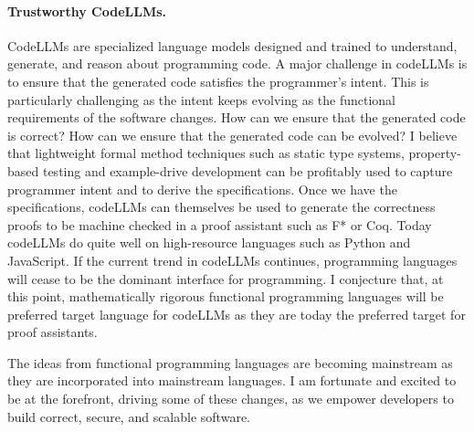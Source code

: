 \documentclass[screen,acmsmall,nonacm]{acmart}
\begin{document}
\paragraph{\bf Trustworthy CodeLLMs.} CodeLLMs are specialized language models
designed and trained to understand, generate, and reason about programming
code. A major challenge in codeLLMs is to ensure that the generated code
satisfies the programmer's intent. This is particularly challenging as the
intent keeps evolving as the functional requirements of the software changes.
How can we ensure that the generated code is correct? How can we ensure that
the generated code can be evolved? I believe that lightweight formal method
techniques such as static type systems, property-based testing and
example-drive development can be profitably used to capture programmer intent
and to derive the specifications. Once we have the specifications, codeLLMs can
themselves be used to generate the correctness proofs to be machine checked in
a proof assistant such as F* or Coq. Today codeLLMs do quite well on
high-resource languages such as Python and JavaScript. If the current trend in
codeLLMs continues, programming languages will cease to be the dominant
interface for programming. I conjecture that, at this point, mathematically
rigorous functional programming languages will be preferred target language for
codeLLMs as they are today the preferred target for proof assistants.

The ideas from functional programming languages are becoming mainstream as they
are incorporated into mainstream languages. I am fortunate and excited to be at
the forefront, driving some of these changes, as we empower developers to build
correct, secure, and scalable software.



\end{document}
